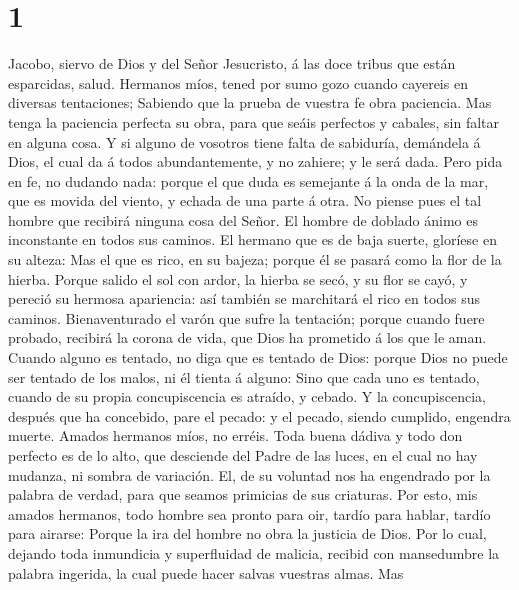\hypertarget{section}{%
\section{1}\label{section}}

 Jacobo, siervo de Dios y del Señor Jesucristo, á las doce
tribus que están esparcidas, salud.  Hermanos míos, tened
por sumo gozo cuando cayereis en diversas tentaciones; 
Sabiendo que la prueba de vuestra fe obra paciencia.  Mas
tenga la paciencia perfecta su obra, para que seáis perfectos y cabales,
sin faltar en alguna cosa.  Y si alguno de vosotros tiene
falta de sabiduría, demándela á Dios, el cual da á todos abundantemente,
y no zahiere; y le será dada.  Pero pida en fe, no dudando
nada: porque el que duda es semejante á la onda de la mar, que es movida
del viento, y echada de una parte á otra.  No piense pues el
tal hombre que recibirá ninguna cosa del Señor.  El hombre
de doblado ánimo es inconstante en todos sus caminos.  El
hermano que es de baja suerte, gloríese en su alteza:  Mas
el que es rico, en su bajeza; porque él se pasará como la flor de la
hierba.  Porque salido el sol con ardor, la hierba se secó,
y su flor se cayó, y pereció su hermosa apariencia: así también se
marchitará el rico en todos sus caminos.  Bienaventurado el
varón que sufre la tentación; porque cuando fuere probado, recibirá la
corona de vida, que Dios ha prometido á los que le aman. 
Cuando alguno es tentado, no diga que es tentado de Dios: porque Dios no
puede ser tentado de los malos, ni él tienta á alguno: 
Sino que cada uno es tentado, cuando de su propia concupiscencia es
atraído, y cebado.  Y la concupiscencia, después que ha
concebido, pare el pecado: y el pecado, siendo cumplido, engendra
muerte.  Amados hermanos míos, no erréis. 
Toda buena dádiva y todo don perfecto es de lo alto, que desciende del
Padre de las luces, en el cual no hay mudanza, ni sombra de variación.
 El, de su voluntad nos ha engendrado por la palabra de
verdad, para que seamos primicias de sus criaturas.  Por
esto, mis amados hermanos, todo hombre sea pronto para oir, tardío para
hablar, tardío para airarse:  Porque la ira del hombre no
obra la justicia de Dios.  Por lo cual, dejando toda
inmundicia y superfluidad de malicia, recibid con mansedumbre la palabra
ingerida, la cual puede hacer salvas vuestras almas.  Mas
